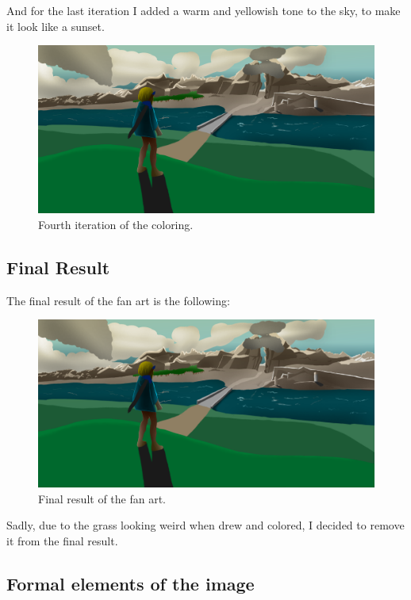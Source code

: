\documentclass{cup-pan}
\begin{document}
        And for the last iteration I added a warm and yellowish tone to the sky, to make it look like a sunset.\\
        \begin{figure}[H]
            \includegraphics[width=\textwidth]{Imagenes/Fanart1/Color/IIII_Iteracion.png}
            \caption{Fourth iteration of the coloring.}
        \end{figure}
        
    \subsection{Final Result}
        The final result of the fan art is the following:
        \begin{figure}[H]
            \includegraphics[width=\textwidth]{Imagenes/Fanart1/Color/IIII_Iteracion.png}
            \caption{Final result of the fan art.}
        \end{figure}
        Sadly, due to the grass looking weird when drew and colored, I decided to remove it from the final result.\\

    \subsection{Formal elements of the image}
\end{document}
